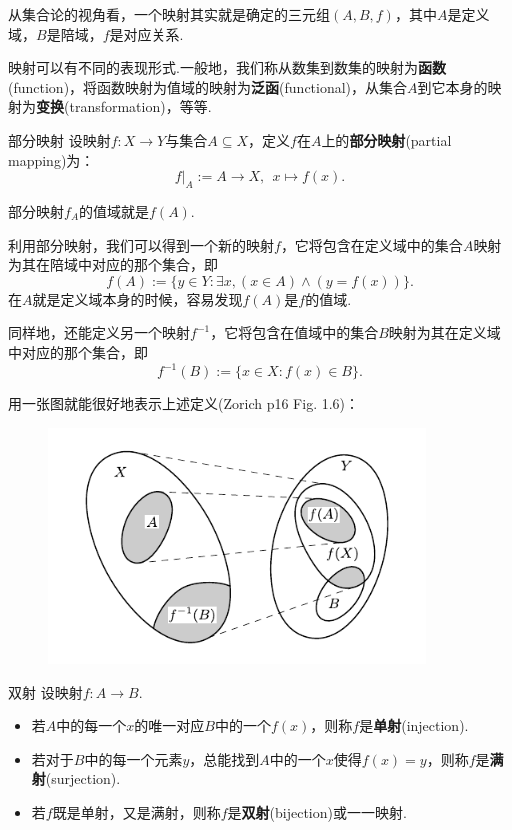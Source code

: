 \documentclass[lang=cn, zihao=5]{elegantbook}
\begin{document}
从集合论的视角看，一个映射其实就是确定的三元组$(A,B,f)$，其中$A$是定义域，$B$是陪域，$f$是对应关系.

映射可以有不同的表现形式.一般地，我们称从数集到数集的映射为\textbf{函数}(function)，将函数映射为值域的映射为\textbf{泛函}(functional)，从集合$A$到它本身的映射为\textbf{变换}(transformation)，等等.

\begin{definition}{部分映射}
	设映射$f:X \to Y$与集合$A \subseteq X$，定义$f$在$A$上的\textbf{部分映射}(partial mapping)为：$$f|_A := A \to X,~~x \mapsto f(x).$$
\end{definition}
\begin{remark}
	部分映射$f_A$的值域就是$f(A)$.
\end{remark}

利用部分映射，我们可以得到一个新的映射$f$，它将包含在定义域中的集合$A$映射为其在陪域中对应的那个集合，即$$f(A) := \{ y \in Y:\exists x, (x \in A) \wedge (y=f(x)) \}.$$
在$A$就是定义域本身的时候，容易发现$f(A)$是$f$的值域.

同样地，还能定义另一个映射$f^{-1}$，它将包含在值域中的集合$B$映射为其在定义域中对应的那个集合，即$$f^{-1}(B) := \{ x \in X:f(x) \in B \}.$$

用一张图就能很好地表示上述定义(Zorich p16 Fig. 1.6)：

\begin{figure}[h!]
	\centering
	\includegraphics[width=10cm]{attachment/Acr1745354698752707434.pdf}
\end{figure}

\begin{definition}{双射}
	设映射$f:A \to B$.
	\begin{itemize}
		\item 若$A$中的每一个$x$的唯一对应$B$中的一个$f(x)$，则称$f$是\textbf{单射}(injection).
		\item 若对于$B$中的每一个元素$y$，总能找到$A$中的一个$x$使得$f(x)=y$，则称$f$是\textbf{满射}(surjection).
		\item 若$f$既是单射，又是满射，则称$f$是\textbf{双射}(bijection)或一一映射.
	\end{itemize}
\end{definition}
\end{document}
